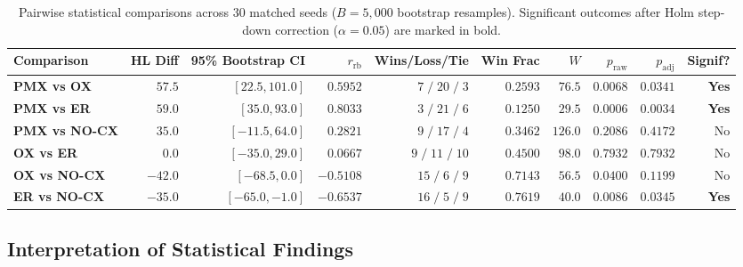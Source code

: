 \documentclass[10pt,a4paper]{article}
\begin{document}
\begin{table}[htbp]
\centering
\footnotesize
\setlength{\tabcolsep}{2.8pt}
\caption{Pairwise statistical comparisons across 30 matched seeds ($B=5{,}000$ bootstrap resamples). Significant outcomes after Holm step-down correction ($\alpha=0.05$) are marked in bold.}
\label{tab:pairwise_tests}
\begin{tabular}{lrrrrrrrrr}
\toprule
\textbf{Comparison} & \textbf{HL Diff} & \textbf{95\% Bootstrap CI} & \textbf{$r_{\text{rb}}$} & \textbf{Wins/Loss/Tie} & \textbf{Win Frac} & \textbf{$W$} & \textbf{$p_{\text{raw}}$} & \textbf{$p_{\text{adj}}$} & \textbf{Signif?} \\
\midrule
\textbf{PMX vs OX}    & $57.5$ & $[22.5, 101.0]$   & $0.5952$  & $7\;/\;20\;/\;3$ & $0.2593$ & $76.5$  & $0.0068$ & $\mathbf{0.0341}$ & \textbf{Yes} \\
\textbf{PMX vs ER}    & $59.0$ & $[35.0, 93.0]$    & $0.8033$  & $3\;/\;21\;/\;6$ & $0.1250$ & $29.5$  & $0.0006$ & $\mathbf{0.0034}$ & \textbf{Yes} \\
\textbf{PMX vs NO-CX} & $35.0$ & $[-11.5, 64.0]$   & $0.2821$  & $9\;/\;17\;/\;4$ & $0.3462$ & $126.0$ & $0.2086$ & $0.4172$          & No \\
\textbf{OX vs ER}     & $0.0$  & $[-35.0, 29.0]$   & $0.0667$  & $9\;/\;11\;/\;10$& $0.4500$ & $98.0$  & $0.7932$ & $0.7932$          & No \\
\textbf{OX vs NO-CX}  & $-42.0$& $[-68.5, 0.0]$    & $-0.5108$ & $15\;/\;6\;/\;9$ & $0.7143$ & $56.5$  & $0.0400$ & $0.1199$          & No \\
\textbf{ER vs NO-CX}  & $-35.0$& $[-65.0, -1.0]$   & $-0.6537$ & $16\;/\;5\;/\;9$ & $0.7619$ & $40.0$  & $0.0086$ & $\mathbf{0.0345}$ & \textbf{Yes} \\
\bottomrule
\end{tabular}
\end{table}

\subsection{Interpretation of Statistical Findings}
\end{document}
